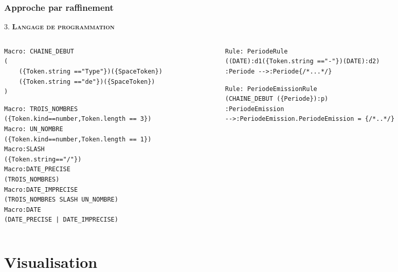 \documentclass[10pt, compress]{beamer}
\begin{document}
\begin{frame}[fragile,t]
  \frametitle{Approche par raffinement}
\begin{center}
 
\end{center}
3. \textbf{\textsc{Langage de programmation}}\\
\begin{columns}[t]
  \begin{column}{.5\linewidth}
\begin{lstlisting}
Macro: CHAINE_DEBUT
(
    ({Token.string =="Type"})({SpaceToken})
    ({Token.string =="de"})({SpaceToken})
)
\end{lstlisting}
\begin{lstlisting}
Macro: TROIS_NOMBRES
({Token.kind==number,Token.length == 3})
Macro: UN_NOMBRE
({Token.kind==number,Token.length == 1})
Macro:SLASH
({Token.string=="/"})
Macro:DATE_PRECISE
(TROIS_NOMBRES)
Macro:DATE_IMPRECISE
(TROIS_NOMBRES SLASH UN_NOMBRE)
Macro:DATE
(DATE_PRECISE | DATE_IMPRECISE)
\end{lstlisting}
\end{column}


\begin{column}{.5\linewidth}
\begin{lstlisting}
Rule: PeriodeRule
((DATE):d1({Token.string =="-"})(DATE):d2)
:Periode -->:Periode{/*...*/}
\end{lstlisting}
\begin{lstlisting}
Rule: PeriodeEmissionRule
(CHAINE_DEBUT ({Periode}):p)
:PeriodeEmission
-->:PeriodeEmission.PeriodeEmission = {/*..*/}
\end{lstlisting}
\end{column}
\end{columns}
\end{frame}

\section{Visualisation}
\end{document}
